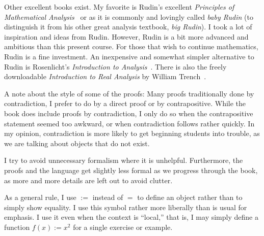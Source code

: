 \documentclass[12pt]{book}
\newcommand{\R}{{\mathbb{R}}}
\theoremstyle{plain}
\theoremstyle{remark}
\theoremstyle{definition}
\theoremstyle{exercise}
\theoremstyle{example}
\newcommand{\sectionref}[1]{\hyperref[#1]{\S\ref*{#1}}}
\begin{document}
Other excellent books exist.  My favorite is 
Rudin's excellent
\emph{Principles of Mathematical Analysis}~\cite{Rudin:baby}
or as it is commonly and lovingly called \emph{baby Rudin}
(to distinguish it from his other great analysis textbook,
\emph{big Rudin}).  I took a
lot of inspiration and ideas from Rudin.  However, Rudin is a bit more
advanced and ambitious than this present course.
For those that wish to continue
mathematics, Rudin is a fine investment.
An inexpensive and somewhat simpler alternative to Rudin is
Rosenlicht's \emph{Introduction to Analysis}~\cite{Rosenlicht}.
There is also the freely downloadable \emph{Introduction to Real
Analysis} by William Trench~\cite{Trench}.

\medskip

A note about the style of some of the proofs:  Many proofs
traditionally done by contradiction, I prefer to do by
a direct proof or by contrapositive.  While the book does include
proofs by contradiction, I only
do so when the contrapositive statement seemed too awkward, or when 
contradiction follows rather quickly.  In my opinion,
contradiction is more likely to get beginning students into trouble,
as we are talking about objects that do not exist.

I try to avoid unnecessary formalism where it is unhelpful.
Furthermore, the proofs and the language get slightly less formal as we
progress through the book, as more and more details are left out to avoid
clutter.

As a general rule, I use $:=$ instead of $=$ to define an
object rather than to simply show equality.  I use this symbol rather more
liberally than is usual for emphasis.
I use it even when the context is ``local,''
that is, I may simply define a function $f(x) := x^2$
for a single exercise or example.

%
\end{document}
